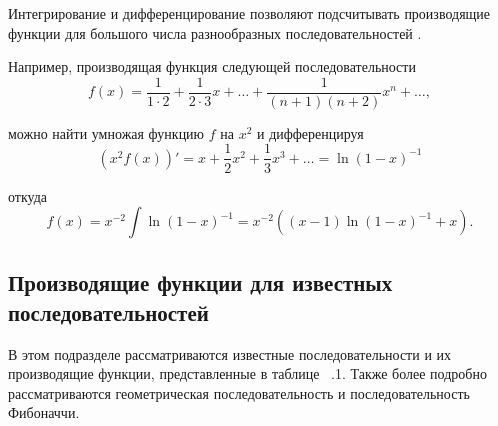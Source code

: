 \documentclass[
russian,
cp1251,
14pt,
simple
]{eskdtext}
\theoremstyle{definition}
\begin{document}
Интегрирование и дифференцирование позволяют подсчитывать производящие функции для большого числа разнообразных последовательностей \cite{Lando}. 

Например, производящая функция следующей последовательности
$$
f\left(x\right) = \frac{1}{1 \cdot 2} + \frac{1}{2 \cdot 3} x + \ldots + \frac{1}{\left(n + 1\right)\left(n + 2\right)} x^n + \ldots,  
$$

можно найти умножая функцию $f$ на $x^2$ и дифференцируя
$$
\left(x^2 f\left(x\right)\right)' = x + \frac{1}{2} x^2 + \frac{1}{3} x^3 + \ldots = \ln\left(1 - x\right)^{-1}
$$

откуда 
$$
f\left(x\right) = x^{-2} \int \ln \left(1 - x\right)^{-1} = x^{-2} \left(\left(x - 1\right)\ln \left(1 - x\right)^{-1} + x\right).  
$$

\subsection{Производящие функции для известных последовательностей}

В этом подразделе рассматриваются известные последовательности и их производящие функции, представленные в таблице ~\thesubsection.1. Также более подробно рассматриваются геометрическая последовательность и последовательность Фибоначчи.
\end{document}
